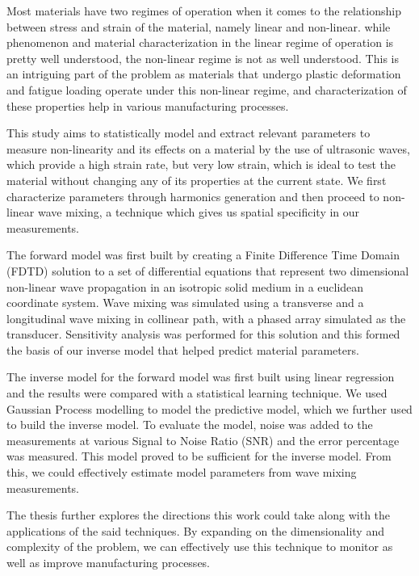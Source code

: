 Most materials have two regimes of operation when it comes to the relationship between stress and strain of the material, namely linear and non-linear. while phenomenon and material characterization in the linear regime of operation is pretty well understood, the non-linear regime is not as well understood. This is an intriguing part of the problem as materials that undergo plastic deformation and fatigue loading operate under this non-linear regime, and characterization of these properties help in various manufacturing processes.

This study aims to statistically model and extract relevant parameters to measure non-linearity and its effects on a material by the use of ultrasonic waves, which provide a high strain rate, but very low strain, which is ideal to test the material without changing any of its properties at the current state. We first characterize parameters through harmonics generation and then proceed to non-linear wave mixing, a technique which gives us spatial specificity in our measurements. 

The forward model was first built by creating a Finite Difference Time Domain (FDTD) solution to a set of differential equations that represent two dimensional non-linear wave propagation in an isotropic solid medium in a euclidean coordinate system. Wave mixing was simulated using a transverse and a longitudinal wave mixing in collinear path, with a phased array simulated as the transducer. Sensitivity analysis was performed for this solution and this formed the basis of our inverse model that helped predict material parameters.

The inverse model for the forward model was first built using linear regression and the results were compared with a statistical learning technique. We used Gaussian Process modelling to model the predictive model, which we further used to build the inverse model. To evaluate the model, noise was added to the measurements at various Signal to Noise Ratio (SNR) and the error percentage was measured. This model proved to be sufficient for the inverse model. From this, we could effectively estimate model parameters from wave mixing measurements.

The thesis further explores the directions this work could take along with the applications of the said techniques. By expanding on the dimensionality and complexity of the problem, we can effectively use this technique to monitor as well as improve manufacturing processes. 